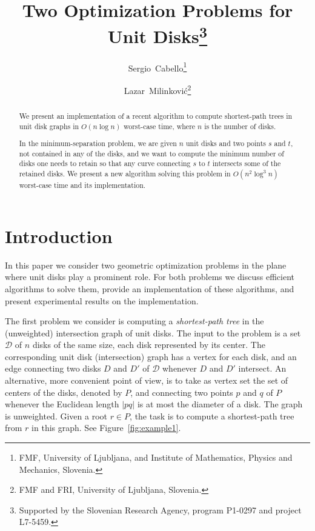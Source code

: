 \documentclass[a4paper,11pt]{article}
\title{Two Optimization Problems for Unit Disks\thanks{Supported by the Slovenian Research Agency, program P1-0297 and project L7-5459.}}
\author{Sergio~Cabello\footnote{FMF, University of Ljubljana, and 
	Institute of Mathematics, Physics and Mechanics, Slovenia.}}
\author{Lazar~Milinkovi\'c\footnote{FMF and FRI, University of Ljubljana, Slovenia.}}
\newcommand{\D}{\ensuremath{\mathcal{D}}}
\begin{document}
\maketitle

\begin{abstract}
We present an implementation of a recent algorithm to compute shortest-path trees
in unit disk graphs in $O(n\log n)$ worst-case time, 
where $n$ is the number of disks.

In the minimum-separation problem, we are given $n$ unit disks and two points $s$ and $t$,
not contained in any of the disks, and we want to compute 
the minimum number of disks one needs to retain so that any curve connecting
$s$ to $t$ intersects some of the retained disks.
We present a new algorithm solving this problem in $O(n^2\log^3 n)$ worst-case time
and its implementation.
\end{abstract}

\section{Introduction}

In this paper we consider two geometric optimization problems in the plane
where unit disks play a prominent role. For both problems 
we discuss efficient algorithms to solve them, provide an implementation
of these algorithms, and present experimental results on the implementation.

The first problem we consider is computing a \emph{shortest-path tree} 
in the (unweighted) intersection graph of unit disks. 
The input to the problem is a set $\D$ of $n$ disks of the same size, 
each disk represented by its center.
The corresponding unit disk (intersection) graph has a vertex for each disk,
and an edge connecting two disks $D$ and $D'$ of $\D$ whenever $D$ and $D'$ intersect.
An alternative, more convenient point of view, is to take as vertex set the set of
centers of the disks, denoted by $P$, and connecting two points $p$ and $q$ of $P$ 
whenever the Euclidean length $|pq|$ is at most the diameter of a disk. 
The graph is unweighted.
Given a root $r\in P$, the task is to compute a shortest-path tree from $r$ in this graph.
See Figure~\ref{fig:example1}.
\end{document}
